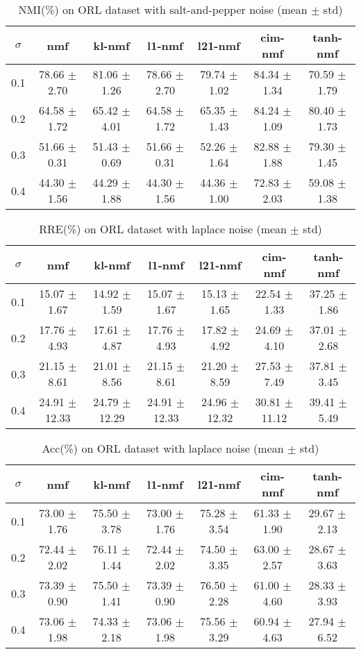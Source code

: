 \documentclass{article} %
\begin{document}
\begin{table}
\begin{tabular}{c|cccccc}$\sigma$ & nmf & kl-nmf & l1-nmf & l21-nmf & cim-nmf & tanh-nmf \\\hline
0.1 & 78.66 $\pm$ 2.70 & 81.06 $\pm$ 1.26 & 78.66 $\pm$ 2.70 & 79.74 $\pm$ 1.02 & 84.34 $\pm$ 1.34 & 70.59 $\pm$ 1.79 \\
0.2 & 64.58 $\pm$ 1.72 & 65.42 $\pm$ 4.01 & 64.58 $\pm$ 1.72 & 65.35 $\pm$ 1.43 & 84.24 $\pm$ 1.09 & 80.40 $\pm$ 1.73 \\
0.3 & 51.66 $\pm$ 0.31 & 51.43 $\pm$ 0.69 & 51.66 $\pm$ 0.31 & 52.26 $\pm$ 1.64 & 82.88 $\pm$ 1.88 & 79.30 $\pm$ 1.45 \\
0.4 & 44.30 $\pm$ 1.56 & 44.29 $\pm$ 1.88 & 44.30 $\pm$ 1.56 & 44.36 $\pm$ 1.00 & 72.83 $\pm$ 2.03 & 59.08 $\pm$ 1.38 \\
\end{tabular}\caption{
  NMI(\%) on ORL dataset with salt-and-pepper noise (mean $\pm$ std)
  \label{tab:NMI-ORL-salt-and-pepper}
}\end{table}
\begin{table}
\begin{tabular}{c|cccccc}$\sigma$ & nmf & kl-nmf & l1-nmf & l21-nmf & cim-nmf & tanh-nmf \\\hline
0.1 & 15.07 $\pm$ 1.67 & 14.92 $\pm$ 1.59 & 15.07 $\pm$ 1.67 & 15.13 $\pm$ 1.65 & 22.54 $\pm$ 1.33 & 37.25 $\pm$ 1.86 \\
0.2 & 17.76 $\pm$ 4.93 & 17.61 $\pm$ 4.87 & 17.76 $\pm$ 4.93 & 17.82 $\pm$ 4.92 & 24.69 $\pm$ 4.10 & 37.01 $\pm$ 2.68 \\
0.3 & 21.15 $\pm$ 8.61 & 21.01 $\pm$ 8.56 & 21.15 $\pm$ 8.61 & 21.20 $\pm$ 8.59 & 27.53 $\pm$ 7.49 & 37.81 $\pm$ 3.45 \\
0.4 & 24.91 $\pm$ 12.33 & 24.79 $\pm$ 12.29 & 24.91 $\pm$ 12.33 & 24.96 $\pm$ 12.32 & 30.81 $\pm$ 11.12 & 39.41 $\pm$ 5.49 \\
\end{tabular}\caption{
  RRE(\%) on ORL dataset with laplace noise (mean $\pm$ std)
  \label{tab:RRE-ORL-laplace}
}\end{table}
\begin{table}
\begin{tabular}{c|cccccc}$\sigma$ & nmf & kl-nmf & l1-nmf & l21-nmf & cim-nmf & tanh-nmf \\\hline
0.1 & 73.00 $\pm$ 1.76 & 75.50 $\pm$ 3.78 & 73.00 $\pm$ 1.76 & 75.28 $\pm$ 3.54 & 61.33 $\pm$ 1.90 & 29.67 $\pm$ 2.13 \\
0.2 & 72.44 $\pm$ 2.02 & 76.11 $\pm$ 1.44 & 72.44 $\pm$ 2.02 & 74.50 $\pm$ 3.35 & 63.00 $\pm$ 2.57 & 28.67 $\pm$ 3.63 \\
0.3 & 73.39 $\pm$ 0.90 & 75.50 $\pm$ 1.41 & 73.39 $\pm$ 0.90 & 76.50 $\pm$ 2.28 & 61.00 $\pm$ 4.60 & 28.33 $\pm$ 3.93 \\
0.4 & 73.06 $\pm$ 1.98 & 74.33 $\pm$ 2.18 & 73.06 $\pm$ 1.98 & 75.56 $\pm$ 3.29 & 60.94 $\pm$ 4.63 & 27.94 $\pm$ 6.52 \\
\end{tabular}\caption{
  Acc(\%) on ORL dataset with laplace noise (mean $\pm$ std)
  \label{tab:Acc-ORL-laplace}
}\end{table}
\end{document}
